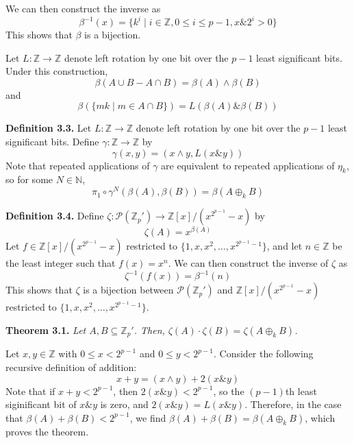 \documentclass{article}
\newcommand{\zee}{\mathbb{Z}}
\newcommand{\N}{\mathbb{N}}
\begin{document}
We can then construct the inverse as
\[\beta^{-1}(x) = \{k^i \mid i \in \zee,
    0 \leq i \leq p - 1,
    x \mathbin{\&} 2^i > 0\}\]
This shows that $\beta$ is a bijection.

Let $L: \zee \rightarrow \zee$ denote left rotation by one bit
over the $p-1$ least significant bits.
Under this construction,
\[\beta(A \cup B - A \cap B) = \beta(A) \wedge \beta(B)\]
and
\[\beta(\{mk \mid m \in A \cap B\}) = L(\beta(A) \mathbin{\&} \beta(B))\]

\textbf{Definition 3.3.}
Let $L: \zee \rightarrow \zee$ denote left rotation by one bit
over the $p-1$ least significant bits.
Define $\gamma: \zee \rightarrow \zee$
by
\[\gamma(x, y) = (x \wedge y, L(x \mathbin{\&} y))\]
Note that repeated applications of $\gamma$ are equivalent to
repeated applications of $\eta_k$, so for some $N \in \N$,
\[\pi_1 \circ \gamma^N(\beta(A), \beta(B)) = \beta(A \oplus_k B)\]

\textbf{Definition 3.4.} Define $\zeta: \mathcal{P}(\zee_p')
\rightarrow \zee[x]/(x^{2^{p-1}}-x)$ by
\[\zeta(A) = x^{\beta(A)}\]
Let $f \in \zee[x]/(x^{2^{p-1}}-x)$ restricted to
$\{1, x, x^2, \ldots, x^{2^{p-1}-1}\}$,
and let $n \in \zee$ be the least integer such that
$f(x) = x^n$.
We can then construct the inverse of $\zeta$ as
\[\zeta^{-1}(f(x)) = \beta^{-1}(n)\]
This shows that $\zeta$ is a bijection between
$\mathcal{P}(\zee_p')$ and $\zee[x]/(x^{2^{p-1}}-x)$ restricted to
$\{1, x, x^2, \ldots, x^{2^{p-1}-1}\}$.

\textbf{Theorem 3.1.} \textit{Let $A, B \subseteq \zee_p'$.
Then, $\zeta(A) \cdot \zeta(B) = \zeta(A \oplus_k B)$.}

Let $x, y \in \zee$ with $0 \leq x < 2^{p-1}$
and $0 \leq y < 2^{p-1}$.
Consider the following recursive definition of addition:
\[x + y = (x \wedge y) + 2(x \mathbin{\&} y)\]
Note that if $x + y < 2^{p-1}$, then
$2(x \mathbin{\&} y) < 2^{p-1}$, so the $(p-1)$th
least siginificant bit of $x \mathbin{\&} y$ is zero,
and $2(x \mathbin{\&} y) = L(x \mathbin{\&} y)$.
Therefore, in the case that $\beta(A) + \beta(B) < 2^{p-1}$,
we find
$\beta(A) + \beta(B) = \beta(A \oplus_k B)$,
which proves the theorem.
\end{document}
